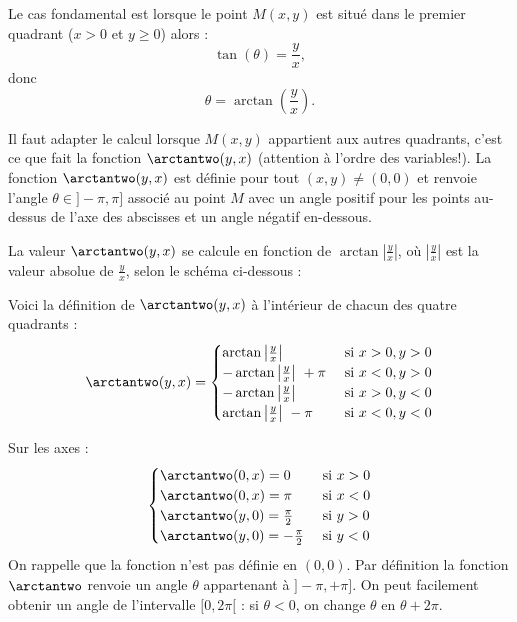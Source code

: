 \documentclass[11pt,class=report,crop=false]{standalone}
\begin{document}

Le cas fondamental est lorsque le point $M(x,y)$ est situé dans le premier quadrant ($x >0$ et $y\ge0$) alors :
$$\tan(\theta) = \frac{y}{x},$$ 
donc
$$\theta = \arctan \left( \frac y x \right).$$

Il faut adapter le calcul lorsque $M(x,y)$ appartient aux autres quadrants, c'est ce que fait la fonction $\arctantwo(y,x)$ (attention à l'ordre des variables!).
La fonction $\arctantwo(y,x)$ est définie pour tout $(x,y) \neq (0,0)$ et renvoie l'angle $\theta \in ]-\pi,\pi]$ associé au point $M$ avec un angle positif pour les points au-dessus de l'axe des abscisses et un angle négatif en-dessous.




La valeur $\arctantwo(y,x)$ se calcule en fonction de $\arctan \left| \frac y x \right|$, où $\left| \frac y x \right|$ est la valeur absolue de $\frac{y}{x}$, selon le schéma ci-dessous :


Voici la définition de $\arctantwo(y,x)$ à l'intérieur de chacun des quatre quadrants :
$$\arctantwo(y,x) = 
\begin{cases}
\arctan\left| \frac y x \right| & \text{ si } x>0, y>0 \\
-\arctan\left| \frac y x \right| \ + \pi & \text{ si } x<0, y>0 \\
-\arctan\left| \frac y x \right| & \text{ si } x>0, y<0 \\
\arctan\left| \frac y x \right| \ -\pi & \text{ si } x<0, y<0 \\	
\end{cases}$$


Sur les axes :
$$
\begin{cases}
\arctantwo(0,x) = 0    & \text{ si } x>0 \\
\arctantwo(0,x) = \pi  & \text{ si } x<0 \\
\arctantwo(y,0) = \frac\pi2  & \text{ si } y>0 \\
\arctantwo(y,0) = -\frac\pi2  & \text{ si } y<0 \\	
\end{cases}$$
On rappelle que la fonction n'est pas définie en $(0,0)$.
Par définition la fonction $\arctantwo$ renvoie un angle $\theta$ appartenant à $]-\pi,+\pi]$. On peut facilement obtenir un angle de l'intervalle $[0,2\pi[$ : si $\theta < 0$, on change $\theta$ en $\theta+2\pi$.
\end{document}
